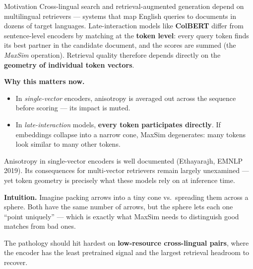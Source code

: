 \documentclass[20pt]{extarticle}
\newcommand{\callout}{\fontsize{18}{23}\selectfont}
\begin{document}
\noindent
\begin{minipage}[t]{0.315\linewidth}

\begin{sectionbox}{Motivation}
Cross-lingual search and retrieval-augmented generation depend on multilingual retrievers --- systems that map English queries to documents in dozens of target languages. Late-interaction models like \textbf{ColBERT} differ from sentence-level encoders by matching at the \textbf{token level}: every query token finds its best partner in the candidate document, and the scores are summed (the \textit{MaxSim} operation). Retrieval quality therefore depends directly on the \textbf{geometry of individual token vectors}.

\vspace{6pt}
\textbf{Why this matters now.}
\begin{itemize}[leftmargin=24pt, itemsep=4pt, topsep=4pt]
\item In \emph{single-vector} encoders, anisotropy is averaged out across the sequence before scoring --- its impact is muted.
\item In \emph{late-interaction} models, \textbf{every token participates directly}. If embeddings collapse into a narrow cone, MaxSim degenerates: many tokens look similar to many other tokens.
\end{itemize}

\vspace{6pt}
Anisotropy in single-vector encoders is well documented (Ethayarajh, EMNLP 2019). Its consequences for multi-vector retrievers remain largely unexamined --- yet token geometry is precisely what these models rely on at inference time.

\begin{intuitionbox}
\callout
\textbf{Intuition.} Imagine packing arrows into a tiny cone vs.\ spreading them across a sphere. Both have the same number of arrows, but the sphere lets each one ``point uniquely'' --- which is exactly what MaxSim needs to distinguish good matches from bad ones.
\end{intuitionbox}

\vspace{4pt}
The pathology should hit hardest on \textbf{low-resource cross-lingual pairs}, where the encoder has the least pretrained signal and the largest retrieval headroom to recover.
\end{sectionbox}


\end{minipage}
\end{document}
